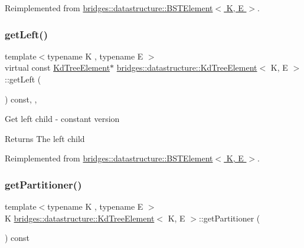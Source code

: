 Reimplemented from \hyperlink{classbridges_1_1datastructure_1_1_b_s_t_element_af863c624691c11db26ae3b6d723d1f5c}{bridges\+::datastructure\+::\+B\+S\+T\+Element$<$ K, E $>$}.

\mbox{\label{classbridges_1_1datastructure_1_1_kd_tree_element_a653597918fbc6e31b84fcf8dbdf67122}} 
\subsubsection{\texorpdfstring{get\+Left()}{getLeft()}\hspace{0.1cm}{\footnotesize\ttfamily [2/2]}}
{\footnotesize\ttfamily template$<$typename K , typename E $>$ \\
virtual const \hyperlink{classbridges_1_1datastructure_1_1_kd_tree_element}{Kd\+Tree\+Element}$\ast$ \hyperlink{classbridges_1_1datastructure_1_1_kd_tree_element}{bridges\+::datastructure\+::\+Kd\+Tree\+Element}$<$ K, E $>$\+::get\+Left (\begin{DoxyParamCaption}{ }\end{DoxyParamCaption}) const\hspace{0.3cm}{\ttfamily [inline]}, {\ttfamily [override]}, {\ttfamily [virtual]}}

Get left child -\/ constant version

\begin{DoxyReturn}{Returns}
The left child 
\end{DoxyReturn}


Reimplemented from \hyperlink{classbridges_1_1datastructure_1_1_b_s_t_element_abac324ef0b480420bd82ecfe4501d60d}{bridges\+::datastructure\+::\+B\+S\+T\+Element$<$ K, E $>$}.

\mbox{\label{classbridges_1_1datastructure_1_1_kd_tree_element_a6b284e9ba808f70e163977ee1e35ba86}} 
\subsubsection{\texorpdfstring{get\+Partitioner()}{getPartitioner()}}
{\footnotesize\ttfamily template$<$typename K , typename E $>$ \\
K \hyperlink{classbridges_1_1datastructure_1_1_kd_tree_element}{bridges\+::datastructure\+::\+Kd\+Tree\+Element}$<$ K, E $>$\+::get\+Partitioner (\begin{DoxyParamCaption}{ }\end{DoxyParamCaption}) const\hspace{0.3cm}{\ttfamily [inline]}}

